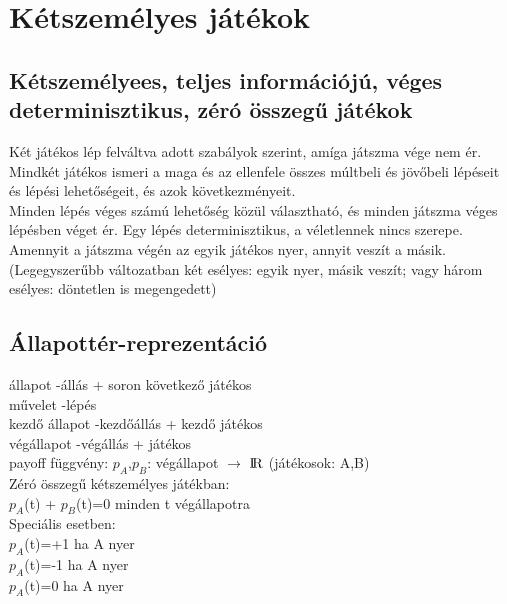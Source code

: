 \documentclass{article}
\begin{document}
	 \section{Kétszemélyes játékok}
	 \subsection{Kétszemélyees, teljes információjú, véges determinisztikus, zéró összegű játékok}
	 Két játékos lép felváltva adott szabályok szerint, amíga játszma vége nem ér.\\
	 Mindkét játékos ismeri a maga és az ellenfele összes múltbeli és jövőbeli lépéseit és lépési lehetőségeit, és azok következményeit.\\
	 Minden lépés véges számú lehetőség közül választható, és minden játszma véges lépésben véget ér. Egy lépés determinisztikus, a véletlennek nincs szerepe.\\
	 Amennyit a játszma végén az egyik játékos nyer, annyit veszít a másik. (Legegyszerűbb változatban két esélyes: egyik nyer, másik veszít; vagy három esélyes: döntetlen is megengedett)\\
	 
	 \subsection{Állapottér-reprezentáció}
	 állapot \hspace{3em} -állás + soron következő játékos\\
	 művelet \hspace{2,6em} -lépés\\
	 kezdő állapot \hspace{0,6em}-kezdőállás + kezdő játékos\\
	 végállapot \hspace{2em}-végállás + játékos\\
	 payoff függvény: $p_A$,$p_B$: végállapot $\rightarrow$  ${\rm I\!R}$ (játékosok: A,B)\\
	 \hspace*{1em} Zéró összegű kétszemélyes játékban:\\
	 \hspace*{2em} $p_A$(t) + $p_B$(t)=0 minden t végállapotra\\
	 \hspace*{1em} Speciális esetben:\\
	 \hspace*{2em} $p_A$(t)=+1 ha A nyer\\
	 \hspace*{2em} $p_A$(t)=-1 ha A nyer\\
	 \hspace*{2em} $p_A$(t)=0 ha A nyer\\
	 
\end{document}
